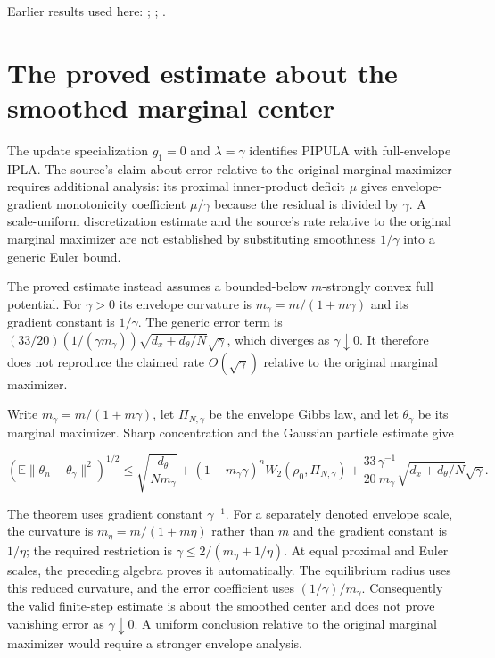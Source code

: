 \documentclass[11pt,a4paper]{article}
\begin{document}
Earlier results used here: \cite[Section~3.1.1]{LangevinLean2026IPLA}; \cite[Section~3.3.3]{LangevinLean2026IPLA}; \cite[Section~3.4.3]{LangevinLean2026IPLA}.

\section{\texorpdfstring{The proved estimate about the smoothed marginal center}{The proved estimate about the smoothed marginal center}}


The update specialization \(g_1=0\) and \(\lambda=\gamma\) identifies PIPULA with full-envelope IPLA. The source’s claim about error relative to the original marginal maximizer requires additional analysis: its proximal inner-product deficit \(\mu\) gives envelope-gradient monotonicity coefficient \(\mu/\gamma\) because the residual is divided by \(\gamma\). A scale-uniform discretization estimate and the source’s rate relative to the original marginal maximizer are not established by substituting smoothness \(1/\gamma\) into a generic Euler bound.



The proved estimate instead assumes a bounded-below \(m\)-strongly convex full potential. For \(\gamma>0\) its envelope curvature is \(m_\gamma=m/(1+m\gamma)\) and its gradient constant is \(1/\gamma\). The generic error term is \((33/20)(1/(\gamma m_\gamma))\sqrt{d_x+d_\theta/N}\sqrt\gamma\), which diverges as \(\gamma\downarrow0\). It therefore does not reproduce the claimed rate \(O(\sqrt\gamma)\) relative to the original marginal maximizer.



Write \(m_\gamma=m/(1+m\gamma)\), let \(\Pi_{N,\gamma}\) be the envelope Gibbs law, and let \(\theta_\gamma\) be its marginal maximizer. Sharp concentration and the Gaussian particle estimate give

\[\left(\mathbb E\|\theta_n-\theta_\gamma\|^2\right)^{1/2}\le\sqrt{\frac{d_\theta}{Nm_\gamma}}+(1-m_\gamma\gamma)^nW_2(\rho_0,\Pi_{N,\gamma})+\frac{33}{20}\frac{\gamma^{-1}}{m_\gamma}\sqrt{d_x+d_\theta/N}\sqrt\gamma.\]

The theorem uses gradient constant \(\gamma^{-1}\). For a separately denoted envelope scale, the curvature is \(m_\eta=m/(1+m\eta)\) rather than \(m\) and the gradient constant is \(1/\eta\); the required restriction is \(\gamma\le2/(m_\eta+1/\eta)\). At equal proximal and Euler scales, the preceding algebra proves it automatically. The equilibrium radius uses this reduced curvature, and the error coefficient uses \((1/\gamma)/m_\gamma\). Consequently the valid finite-step estimate is about the smoothed center and does not prove vanishing error as \(\gamma\downarrow0\). A uniform conclusion relative to the original marginal maximizer would require a stronger envelope analysis.
\end{document}
